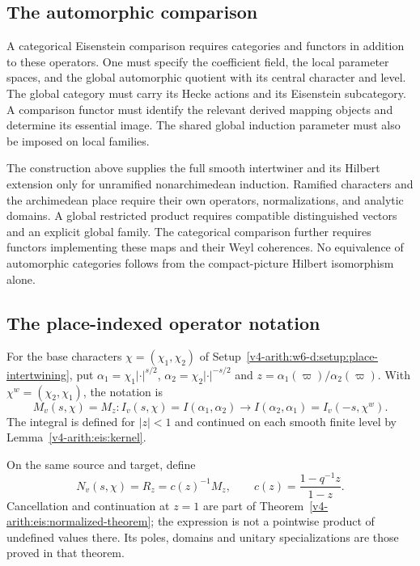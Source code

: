 \subsection{The automorphic comparison}

A categorical Eisenstein comparison requires categories and functors in
addition to these operators.
One must specify the coefficient field, the local parameter spaces,
and the global automorphic quotient with its central character and level.
The global category must carry its Hecke actions and its Eisenstein subcategory.
A comparison functor must identify the relevant derived mapping objects
and determine its essential image.
The shared global induction parameter must also be imposed on local families.

The construction above supplies the full smooth intertwiner and its Hilbert
extension only for unramified nonarchimedean induction.
Ramified characters and the archimedean place require their own operators,
normalizations, and analytic domains.
A global restricted product requires compatible distinguished vectors
and an explicit global family.
The categorical comparison further requires functors implementing these
maps and their Weyl coherences.
No equivalence of automorphic categories follows from the compact-picture
Hilbert isomorphism alone.




\subsection{The place-indexed operator notation}
\begin{definition}
\label{v4-arith:w6-d:def:M-unnormalised}
For the base characters $\chi=(\chi_1,\chi_2)$ of
Setup~\ref{v4-arith:w6-d:setup:place-intertwining}, put
$\alpha_1=\chi_1|\cdot|^{s/2}$,
$\alpha_2=\chi_2|\cdot|^{-s/2}$ and
$z=\alpha_1(\varpi)/\alpha_2(\varpi)$.
With $\chi^w=(\chi_2,\chi_1)$, the notation is
\begin{equation}
\label{v4-arith:w6-d:eq:M-unnormalised}
 M_v(s,\chi)=M_z:
 I_v(s,\chi)=I(\alpha_1,\alpha_2)
 \longrightarrow I(\alpha_2,\alpha_1)=I_v(-s,\chi^w).
\end{equation}
The integral is defined for $|z|<1$ and continued on each smooth
finite level by Lemma~\ref{v4-arith:eis:kernel}.
\end{definition}
\begin{definition}
\label{v4-arith:w6-d:def:N-normalised}
On the same source and target, define
\begin{equation}
\label{v4-arith:w6-d:eq:N-normalised}
 N_v(s,\chi)=R_z=c(z)^{-1}M_z,
 \qquad c(z)=\frac{1-q^{-1}z}{1-z}.
\end{equation}
Cancellation and continuation at $z=1$ are part of
Theorem~\ref{v4-arith:eis:normalized-theorem}; the expression is not
a pointwise product of undefined values there. Its poles, domains
and unitary specializations are those proved in that theorem.
\end{definition}

